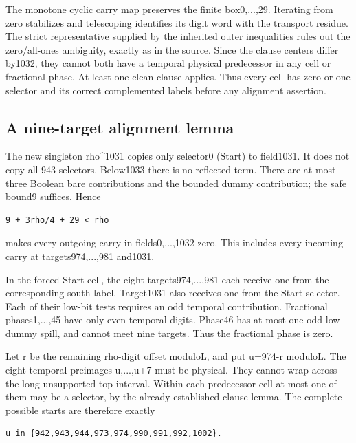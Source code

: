 The monotone cyclic carry map preserves the finite box0,...,29. Iterating from zero stabilizes and telescoping identifies its digit word with the transport residue. The strict representative supplied by the inherited outer inequalities rules out the zero/all-ones ambiguity, exactly as in the source. Since the clause centers differ by1032, they cannot both have a temporal physical predecessor in any cell or fractional phase. At least one clean clause applies. Thus every cell has zero or one selector and its correct complemented labels before any alignment assertion.

\subsection{A nine-target alignment lemma}
The new singleton rho\textasciicircum{}1031 copies only selector0 (Start) to field1031. It does not copy all 943 selectors. Below1033 there is no reflected term. There are at most three Boolean bare contributions and the bounded dummy contribution; the safe bound9 suffices. Hence

\begin{Verbatim}[fontsize=\small,breaklines=true,breakanywhere=true,breaksymbolleft={}]
9 + 3rho/4 + 29 < rho
\end{Verbatim}

makes every outgoing carry in fields0,...,1032 zero. This includes every incoming carry at targets974,...,981 and1031.

In the forced Start cell, the eight targets974,...,981 each receive one from the corresponding south label. Target1031 also receives one from the Start selector. Each of their low-bit tests requires an odd temporal contribution. Fractional phases1,...,45 have only even temporal digits. Phase46 has at most one odd low-dummy spill, and cannot meet nine targets. Thus the fractional phase is zero.

Let r be the remaining rho-digit offset moduloL, and put u=974-r moduloL. The eight temporal preimages u,...,u+7 must be physical. They cannot wrap across the long unsupported top interval. Within each predecessor cell at most one of them may be a selector, by the already established clause lemma. The complete possible starts are therefore exactly

\begin{Verbatim}[fontsize=\small,breaklines=true,breakanywhere=true,breaksymbolleft={}]
u in {942,943,944,973,974,990,991,992,1002}.
\end{Verbatim}

